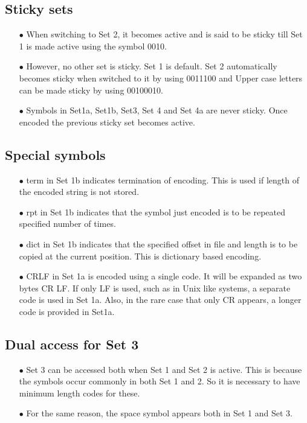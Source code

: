 \documentclass[]{article}
\begin{document}
\subsection{Sticky sets}
\begin{itemize}
	\item[$\bullet$] When switching to Set 2, it becomes active and is said to be sticky till Set 1 is made active using the symbol 0010.
	\item[$\bullet$] However, no other set is sticky. Set 1 is default. Set 2 automatically becomes sticky when switched to it by using 0011100 and Upper case letters can be made sticky by using 00100010.
    \item[$\bullet$] Symbols in Set1a, Set1b, Set3, Set 4 and Set 4a are never sticky. Once encoded the previous sticky set becomes active.
\end{itemize}

\subsection{Special symbols}
\begin{itemize}
	\item[$\bullet$] term in Set 1b indicates termination of encoding.  This is used if length of the encoded string is not stored.
	\item[$\bullet$] rpt in Set 1b indicates that the symbol just encoded is to be repeated specified number of times.
	\item[$\bullet$] dict in Set 1b indicates that the specified offset in file and length is to be copied at the current position. This is dictionary based encoding.
	\item[$\bullet$] CRLF in Set 1a is encoded using a single code. It will be expanded as two bytes CR LF.  If only LF is used, such as in Unix like systems, a separate code is used in Set 1a.  Also, in the rare case that only CR appears, a longer code is provided in Set1a.
\end{itemize}

\subsection{Dual access for Set 3}
\begin{itemize}
	\item[$\bullet$] Set 3 can be accessed both when Set 1 and Set 2 is active.  This is because the symbols occur commonly in both Set 1 and 2.  So it is necessary to have minimum length codes for these.
	\item[$\bullet$] For the same reason, the space symbol appears both in Set 1 and Set 3.
\end{itemize}
\end{document}
